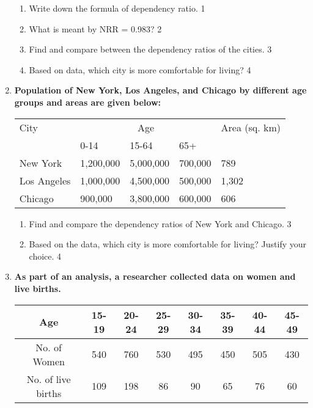 \documentclass[a4paper,oneside, margin=1.4in]{book}
\begin{document}
\begin{enumerate}
  \begin{enumerate}
    \item
	Write down the formula of dependency ratio. \hfill 1
    \item
	What is meant by NRR = 0.983? \hfill 2
    \item  
	Find and compare between the dependency ratios of the cities. \hfill 3
    \item
	Based on data, which city is more comfortable for living? \hfill 4
  \end{enumerate}
  
  \item
  \textbf{Population of New York, Los Angeles, and Chicago by different age groups and areas are given below:} 
  
  \begin{table}[h]
  \begin{center}
  \begin{tabular}{lllll}
  City         & \multicolumn{3}{c}{Age}         & Area (sq. km) \\
               & 0-14      & 15-64    & 65+      &               \\
  New York     & 1,200,000 & 5,000,000 & 700,000  & 789           \\
  Los Angeles  & 1,000,000 & 4,500,000 & 500,000  & 1,302         \\
  Chicago      & 900,000   & 3,800,000 & 600,000  & 606           \\
  \end{tabular}
  \end{center}
  \end{table}
  
  \begin{enumerate}
    \item  
    Find and compare the dependency ratios of New York and Chicago. \hfill 3
    \item
    Based on the data, which city is more comfortable for living? Justify your
    choice. \hfill 4
  \end{enumerate}

  
  
   \item
	  \textbf{As part of an analysis, a researcher collected data on women and live births.} 
	  \begin{table}[h]
	  \centering
\begin{tabular}{c|c|c|c|c|c|c|c}
Age & 15-19 & 20-24 & 25-29 & 30-34 & 35-39 & 40-44 & 45-49 \\ \hline
No. of Women & 540 & 760 & 530 & 495 & 450 & 505 & 430 \\ \hline
No. of live births & 109 & 198 & 86 & 90 & 65 & 76 & 60
\end{tabular}
\end{table}
  

\end{enumerate}
\end{document}
